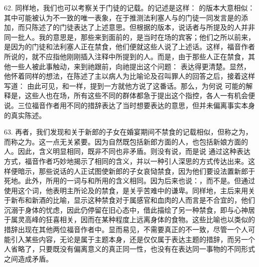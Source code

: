 62. 同样地，我们也可以考察关于门徒的记载。的记述是这样： 的版本大意相似： 其中可能被认为不一致的唯一表象，在于推测法利塞人与的门徒一同发言是的添加，而只陈述了的门徒表达了上述意思。但根据的版本，说话者与所提及的人并非同一批人。我的意思是，那些来到面前的，是当时在场的宾客；他们之所以前来，是因为的门徒和法利塞人正在禁食，他们便就这些人说了上述话。这样，福音作者所说的，就不应指他刚刚插入注释中所提到的人。而是，由于那些人正在禁食，其他一些人被此事触动，来到祂跟前，向祂提出这个问题： 表达得更清楚。显然，他怀着同样的想法，在陈述了主以病人为比喻论及召叫罪人的回答之后，接着这样写道： 由此可见，和一样，提到一方就他方说了这番话。那么，为何说 可能的解释是，这些人也在场，所有这些不同的群体都急于提出这个指控，各人一有机会便说。三位福音作者用不同的措辞表达了当时想要表达的意思，但并未偏离事实本身的真实陈述。\par

63. 再者，我们发现和关于新郎的子女在婚宴期间不禁食的记载相似，但称之为，而称之为。这一点无关紧要。因为自然既包括新郎方面的人，也包括新娘方面的人。因此，含义明显相同，既非不同也非矛盾。则没有说，而是说 通过这种表达方式，福音作者巧妙地揭示了相同的含义，并以一种引人深思的方式传达出来。这样便暗示，那些说话的人正试图使新郎的子女哀恸禁食，因为他们要设法置新郎于死地。此外，所用的一词与和所用的含义相同。因为后来也说：，而不是。但通过使用这个词，他表明主所论及的禁食，是关乎苦难中的谦卑。同样地，主后来用关于新布和新酒的比喻，显示这种禁食对于属感官和血肉的人而言是不合宜的，他们沉溺于身体的忧虑，因此仍停留在旧心态中，借此描绘了另一种禁食，即与心神居于属灵高峰的狂喜相关，因而在某种程度上远离身体的食物。这些比喻也以类似的措辞出现在其他两位福音作者中。显而易见，不需要真正的不一致，尽管一个人可能引入某些内容，无论是属于主题本身，还是仅仅属于表达主题的措辞，而另一个人省略了，只要既没有偏离意义的真正同一性，也没有在表达同一事物的不同形式之间造成矛盾。\par

